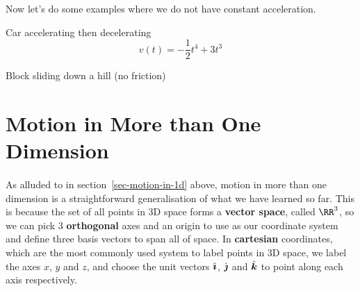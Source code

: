\documentclass[../classical_mechanics.tex]{subfiles}
\begin{document}
        Now let's do some examples where we do not have constant acceleration.
        \begin{example}
            Car accelerating then decelerating %
            \begin{equation*}
                v(t)=-\frac{1}{2}t^4+3t^3
            \end{equation*}
        \end{example}
        \begin{example}
            Block sliding down a hill (no friction) %
        \end{example}

    \section{Motion in More than One Dimension}\label{sec-motion-in-2-3d}
        \paragraph{}
        As alluded to in section~\ref{sec-motion-in-1d} above, motion in more than one dimension is a straightforward generalisation of what we have learned so far.
        This is because the set of all points in 3D space forms a \textbf{vector space}, called $\RR^3$, so we can pick 3 \textbf{orthogonal} axes and an origin to use as our coordinate system and define three basis vectors to span all of space.
        In \textbf{cartesian} coordinates, which are the most commonly used system to label points in 3D space, we label the axes $x$, $y$ and $z$, and choose the unit vectors $\hat{\boldsymbol{\imath}}$, $\hat{\boldsymbol{\jmath}}$ and $\hat{\boldsymbol{k}}$ to point along each axis respectively.
        \begin{figure}[H]
            \centering
        \end{figure}
\end{document}
